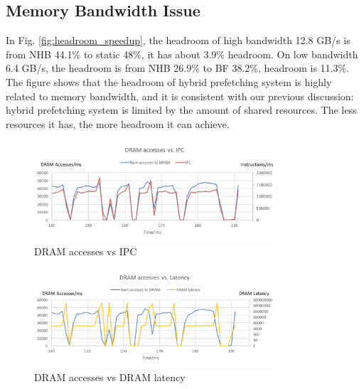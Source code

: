   \subsection{Memory Bandwidth Issue}
  \label{sec:memorybandwidthissue}

  In Fig. \ref{fig:headroom_speedup}, the headroom of high bandwidth 12.8 GB/s is from NHB 44.1\% to static 48\%, it has about 3.9\% headroom. On low bandwidth 6.4 GB/s, the headroom is from NHB 26.9\% to BF 38.2\%, headroom is 11.3\%.
  The figure shows that the headroom of hybrid prefetching system is highly related to memory bandwidth, and it is consistent with our previous discussion: hybrid prefetching system is limited by the amount of shared resources.
  The less resources it has, the more headroom it can achieve.\par

    \begin{figure}[h]
	    \centering
	    \includegraphics[width=0.8\textwidth]{images/bandwidth_IPC.png}
	    \caption{DRAM accesses vs IPC}
	    \label{fig:bandwidth_IPC}
    \end{figure}
    \begin{figure}[h]
	    \centering
	    \includegraphics[width=0.8\textwidth]{images/bandwidth_latency.png}
	    \caption{DRAM accesses vs DRAM latency}
	   \label{fig:bandwidth_latency}
    \end{figure}

